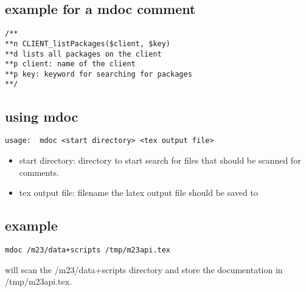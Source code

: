 \subsection{example for a mdoc comment}
\begin{verbatim}
/**
**n CLIENT_listPackages($client, $key)
**d lists all packages on the client
**p client: name of the client
**p key: keyword for searching for packages
**/
\end{verbatim} 
\subsection{using mdoc}
\begin{verbatim}
usage:  mdoc <start directory> <tex output file>
\end{verbatim}
\begin{itemize}
\item start directory: directory to start search for files that should be scanned for comments.
\item tex output file: filename the latex output file should be saved to
\end{itemize}
\subsection{example}
\begin{verbatim}
mdoc /m23/data+scripts /tmp/m23api.tex
\end{verbatim}
will scan the /m23/data+scripts directory and store the documentation in /tmp/m23api.tex.


